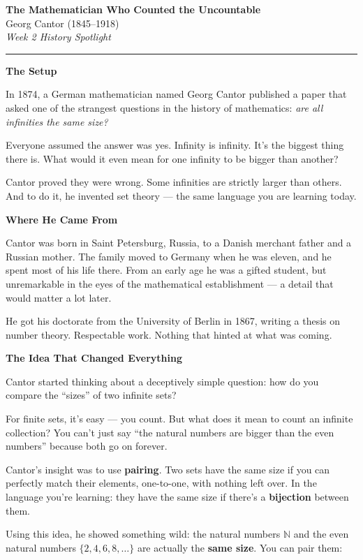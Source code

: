 \documentclass[12pt]{article}
\begin{document}
\begin{center}
  {\Large\bfseries The Mathematician Who Counted the Uncountable}\\[4pt]
  Georg Cantor (1845--1918)\\[6pt]
  \textit{Week 2 History Spotlight}
\end{center}
\hrule\bigskip

\noindent\textbf{The Setup}

In 1874, a German mathematician named Georg Cantor published a paper that asked
one of the strangest questions in the history of mathematics: \textit{are all
infinities the same size?}

Everyone assumed the answer was yes. Infinity is infinity. It's the biggest thing
there is. What would it even mean for one infinity to be bigger than another?

Cantor proved they were wrong. Some infinities are strictly larger than others.
And to do it, he invented set theory --- the same language you are learning today.

\bigskip
\noindent\textbf{Where He Came From}

Cantor was born in Saint Petersburg, Russia, to a Danish merchant father and a
Russian mother. The family moved to Germany when he was eleven, and he spent most
of his life there. From an early age he was a gifted student, but unremarkable in
the eyes of the mathematical establishment --- a detail that would matter a lot later.

He got his doctorate from the University of Berlin in 1867, writing a thesis on
number theory. Respectable work. Nothing that hinted at what was coming.

\bigskip
\noindent\textbf{The Idea That Changed Everything}

Cantor started thinking about a deceptively simple question: how do you compare
the ``sizes'' of two infinite sets?

For finite sets, it's easy --- you count. But what does it mean to count an infinite
collection? You can't just say ``the natural numbers are bigger than the even numbers''
because both go on forever.

Cantor's insight was to use \textbf{pairing}. Two sets have the same size if you
can perfectly match their elements, one-to-one, with nothing left over.
In the language you're learning: they have the same size if there's a \textbf{bijection}
between them.

Using this idea, he showed something wild: the natural numbers $\mathbb{N}$ and
the even natural numbers $\{2, 4, 6, 8, \ldots\}$ are actually the \textbf{same
size}. You can pair them:
\end{document}
